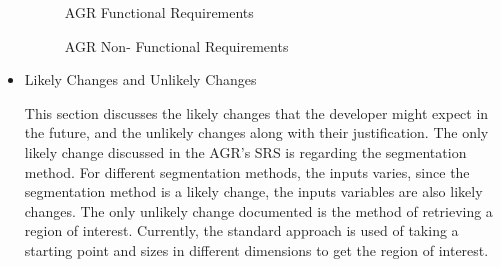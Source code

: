 \begin{itemize}
\begin{figure}[H]
    \centering
    \caption[AGR Functional Requirements]{AGR Functional Requirements}
    \label{fig_agr_fr}
\end{figure}

\begin{figure}[H]
    \centering
    \caption[AGR Non- Functional Requirements]{AGR Non- Functional Requirements}
    \label{fig_agr_nfr}
\end{figure}

\item Likely Changes and Unlikely Changes

This section discusses the likely changes that the developer might expect in the future, and the unlikely changes along with their justification. The only likely change discussed in the AGR's SRS is regarding the segmentation method. For different segmentation methods, the inputs varies, since the segmentation method is a likely change, the inputs variables are also likely changes. The only unlikely change documented is the method of retrieving a region of interest. Currently, the standard approach is used of taking a starting point and sizes in different dimensions to get the region of interest.


\end{itemize}
